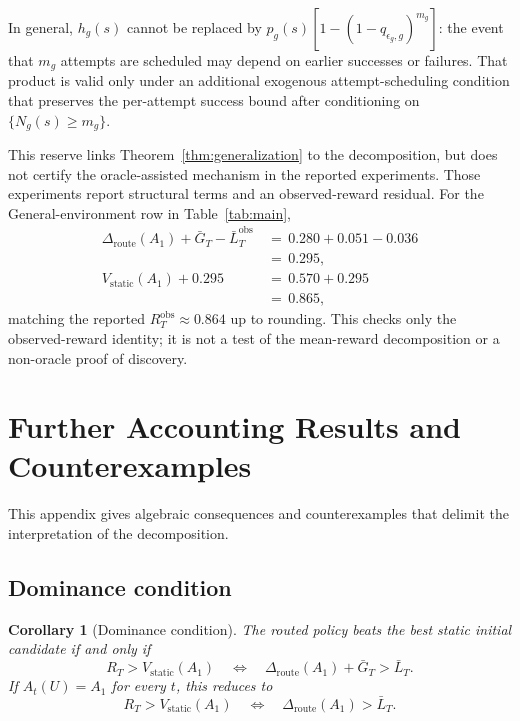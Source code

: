 \documentclass{article} %
\newtheorem{corollary}[theorem]{Corollary}
\begin{document}
In general, $h_g(s)$ cannot be replaced by
$p_g(s)[1-(1-q_{\epsilon_g,g})^{m_g}]$: the event that $m_g$ attempts are
scheduled may depend on earlier successes or failures. That product is valid
only under an additional exogenous attempt-scheduling condition that preserves
the per-attempt success bound after conditioning on $\{N_g(s)\ge m_g\}$.

This reserve links Theorem~\ref{thm:generalization} to the decomposition, but
does not certify the oracle-assisted mechanism in the reported experiments. Those experiments
report structural terms and an observed-reward residual. For the
General-environment row in Table~\ref{tab:main},
\begin{equation}
\begin{aligned}
\Delta_{\mathrm{route}}(A_1)
+
\bar G_T
-
\bar L_T^{\mathrm{obs}}
&\,=\,
0.280+0.051-0.036
\\
&\,=\,
0.295, \\
V_{\mathrm{static}}(A_1)
+
0.295
&\,=\,
0.570+0.295
\\
&\,=\,
0.865,
\end{aligned}
\end{equation}
matching the reported \(R_T^{\mathrm{obs}}\approx0.864\) up to rounding.  This
checks only the observed-reward identity; it is not a test of the mean-reward
decomposition or a non-oracle proof of discovery.

\section{Further Accounting Results and Counterexamples}

\label{app:proofs4}

This appendix gives algebraic consequences and counterexamples that delimit the interpretation of the decomposition.

\subsection{Dominance condition}

\begin{corollary}[Dominance condition]
\label{cor:app-dominance}
The routed policy beats the best static initial candidate if and only if
\begin{equation}
R_T
>
V_{\mathrm{static}}(A_1)
\quad\Longleftrightarrow\quad
\Delta_{\mathrm{route}}(A_1)+\bar G_T>\bar L_T.
\end{equation}
If \(A_t(U)=A_1\) for every \(t\), this reduces to
\begin{equation}
R_T
>
V_{\mathrm{static}}(A_1)
\quad\Longleftrightarrow\quad
\Delta_{\mathrm{route}}(A_1)>\bar L_T.
\end{equation}
\end{corollary}
\end{document}

